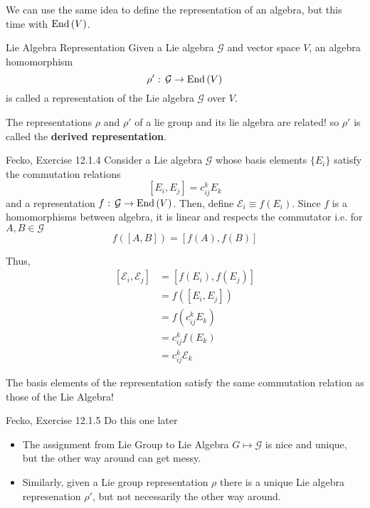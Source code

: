 \documentclass[11pt]{article}
\begin{document}
We can use the same idea to define the representation of an algebra, but this time with $\mathrm{End}\left(V\right)$.

\begin{definition}{Lie Algebra Representation}
  Given a Lie algebra $\mathcal{G}$ and vector space $V$, an algebra homomorphism \[ \rho' \text{ : } \mathcal{G} \rightarrow \mathrm{End}\left(V\right) \] is called a representation of the Lie algebra $\mathcal{G}$ over $V$.
\end{definition}

\begin{remark}{The representations $\rho$ and $\rho'$ of a lie group and its lie algebra are related! so $\rho'$ is called the \textbf{derived representation}.}
\end{remark}

\begin{ex}{Fecko, Exercise 12.1.4}
    Consider a Lie algebra $\mathcal{G}$ whose basis elements $\{E_i\}$ satisfy the commutation relations 
    \[ [E_i, E_j] = c^k_{ij} E_k  \]
    and a representation $f \text{ : } \mathcal{G} \rightarrow \mathrm{End}\left(V\right)$. Then, define $\mathcal{E}_i \equiv f(E_i)$. Since $f$ is a homomorphisms between algebra, it is linear and respects the commutator i.e. for $A, B \in \mathcal{G}$
    \[ f\left( [A, B] \right) = \left[f(A), f(B)\right] \] 

    Thus, 
    \begin{align*}
      \left[ \mathcal{E}_i, \mathcal{E}_j \right] &= \left[f(E_i), f(E_j) \right] \\
      &= f\left([E_i, E_j]\right) \\
      &= f\left(c^k_{ij} E_k\right) \\
      &= c^{k}_{ij} f(E_k) \\
      &= c^{k}_{ij} \mathcal{E}_k 
    \end{align*}

    \begin{thought}{The basis elements of the representation satisfy the same commutation relation as those of the Lie Algebra!}
    \end{thought}
\end{ex}

\begin{ex}{Fecko, Exercise 12.1.5}
    Do this one later
\end{ex}

\vskip 0.5cm
\begin{itemize}
  \item The assignment from Lie Group to Lie Algebra $G \mapsto \mathcal{G}$ is nice and unique, but the other way around can get messy.
  \item Similarly, given a Lie group representation $\rho$ there is a unique Lie algebra represenation $\rho'$, but not necessarily the other way around. 
\end{itemize}
\end{document}
